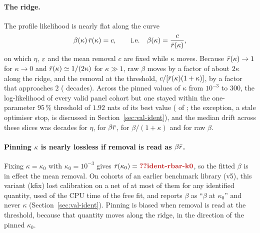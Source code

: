 \paragraph{The ridge.} The profile likelihood is nearly flat along the curve
\begin{equation}\label{eq:ridge}
  \beta(\kappa)\,\bar r(\kappa) = c, \qquad \text{i.e.}\quad \beta(\kappa)=\frac{c}{\bar r(\kappa)},
\end{equation}
on which $\eta$, $\varepsilon$ and the mean removal $c$ are fixed while $\kappa$ moves. Because $\bar r(\kappa)\to1$ for
$\kappa\to0$ and $\bar r(\kappa)\simeq 1/(2\kappa)$ for $\kappa\gg1$, raw $\beta$ moves by a factor of about $2\kappa$
along the ridge, and the removal at the threshold, $c/[\bar r(\kappa)(1+\kappa)]$, by a factor that approaches $2$
( decades). Across the pinned values of $\kappa$ from $10^{-3}$ to $300$, the log-likelihood of every
valid panel cohort but one stayed within the one-parameter $95\,\%$ threshold of $1.92$ nats of its best value
( of ; the exception, a stale optimiser stop, is discussed in
Section~\ref{sec:val-ident}), and the median drift across these slices was  decades for $\eta$,
 for $\beta\bar r$,  for $\beta/(1+\kappa)$ and  for raw $\beta$.

\paragraph{Pinning $\kappa$ is nearly lossless if removal is read as $\beta\bar r$.} Fixing $\kappa=\kappa_0$ with
$\kappa_0=10^{-3}$ gives $\rbar(\kappa_0)=\C{ident-rbar-k0}$, so the fitted $\beta$ is in effect the mean removal. On
 cohorts of an earlier benchmark library (v5), this variant (kfix) lost calibration on a net of at most
 of them for any identified quantity, used
 of the CPU time of the free fit, and reports $\beta$ as ``$\beta$ at $\kappa_0$'' and never $\kappa$
(Section~\ref{sec:val-ident}). Pinning is biased when removal is read at the threshold, because that quantity moves along the
ridge, in the direction of the pinned $\kappa_0$.

